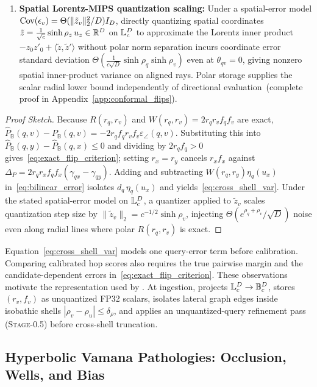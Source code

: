 \begin{theorem}
\begin{enumerate}
  \item \textbf{Spatial {Lorentz}-MIPS quantization scaling:}
  Under a spatial-error model $\operatorname{Cov}(\epsilon_v)=\Theta(\|\tilde z_v\|_2^2/D)I_D$, directly quantizing spatial coordinates $\tilde{z} = \frac{1}{\sqrt{c}}\sinh\rho_z\,u_z \in \mathbb{R}^D$ on $\mathbb{L}_c^D$ to approximate the {Lorentz} inner product $-z_0 z'_0 + \langle \tilde{z}, \tilde{z}'\rangle$ without polar norm separation incurs coordinate error standard deviation $\Theta(\frac{1}{c\sqrt{D}}\sinh\rho_q\sinh\rho_v)$ even at $\theta_{qv} = 0$, giving nonzero spatial inner-product variance on aligned rays. Polar storage supplies the scalar radial lower bound independently of directional evaluation\ifpreprint\ (complete proof in Appendix~\ref{app:conformal_flips})\fi.
\end{enumerate}
\end{theorem}

\begin{proof}[Proof Sketch]
Because $R(r_q, r_v)$ and $W(r_q, r_v) = 2 r_q r_v f_q f_v$ are exact, $\widehat{P}_{\mathbb{B}}(q, v) - P_{\mathbb{B}}(q, v) = -2 r_q f_q r_v f_v \varepsilon_\angle(q, v)$.
Substituting this into $\widehat{P}_{\mathbb{B}}(q, y) - \widehat{P}_{\mathbb{B}}(q, x) \le 0$ and dividing by $2 r_q f_q > 0$ gives~\eqref{eq:exact_flip_criterion}; setting $r_x = r_y$ cancels $r_x f_x$ against $\Delta_P = 2 r_q r_x f_q f_x(\gamma_{qx} - \gamma_{qy})$.
Adding and subtracting $W(r_q, r_y)\eta_q(u_x)$ in~\eqref{eq:bilinear_error} isolates $d_q\,\eta_q(u_x)$ and yields~\eqref{eq:cross_shell_var}.
Under the stated spatial-error model on $\mathbb{L}_c^D$, a quantizer applied to $\tilde{z}_v$ scales quantization step size by $\|\tilde{z}_v\|_2 = c^{-1/2}\sinh\rho_v$, injecting $\Theta(e^{\rho_q + \rho_v}/\sqrt{D})$ noise even along radial lines where polar $R(r_q, r_v)$ is exact.
\end{proof}

Equation~\eqref{eq:cross_shell_var} models one query-error term before calibration. Comparing calibrated hop scores also requires the true pairwise margin and the candidate-dependent errors in~\eqref{eq:exact_flip_criterion}. These observations motivate the representation used by \rquiver{}. At ingestion, \rquiver{} projects $\mathbb{L}_c^D \to \mathbb{B}_c^D$, stores $(r_v,f_v)$ as unquantized FP32 scalars, isolates lateral graph edges inside isobathic shells $|\rho_v - \rho_u| \le \delta_\rho$, and applies an unquantized-query refinement pass (\textsc{Stage-0.5}) before cross-shell truncation.

\subsection{Hyperbolic Vamana Pathologies: Occlusion, Wells, and Bias}
\label{subsec:vamana_pathologies}

